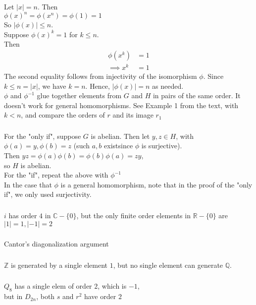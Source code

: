 \documentclass{article}
\newcommand{\ints}{\mathbb{Z}}
\newcommand{\reals}{\mathbb{R}}
\newcommand{\rats}{\mathbb{Q}}
\newcommand{\comps}{\mathbb{C}}
\newcommand{\set}[1]{ \{ #1 \} }
\newcommand{\inv}[1]{ {#1}^{-1} }
\begin{document}
\subsubsection{}
Let $|x| = n$. Then\\
$\phi(x)^n = \phi(x^n) = \phi(1) = 1$\\
So $|\phi(x)| \leq n$.\\
Suppose $\phi(x)^k = 1$ for $k \leq n$.\\
Then
\begin{align*}
\phi(x^k) &= 1\\
\implies x^k &= 1
\end{align*}
The second equality follows from injectivity of the isomorphism $\phi$. Since $k \leq n = |x|$, we have $k = n$. Hence, $|\phi(x)| = n$ as needed.\\
$\phi$ and $\inv{\phi}$ glue together elements from $G$ and $H$ in pairs of the same order. It doesn't work for general homomorphisms. See Example 1 from the text, with $k < n$, and compare the orders of $r$ and its image $r_1$
\subsubsection{}
For the "only if", suppose $G$ is abelian. Then let $y,z \in H$, with $\phi(a) = y, \phi(b) = z$ (such $a,b$ existsince $\phi$ is surjective).\\
Then $yz = \phi(a)\phi(b) = \phi(b)\phi(a) = zy$,\\
so $H$ is abelian.\\
For the "if", repeat the above with $\inv{\phi}$\\
In the case that $\phi$ is a general homomorphism, note that in the proof of the "only if", we only used surjectivity.
\subsubsection{}
$i$ has order $4$ in $\comps - \set{0}$, but the only finite order elements in $\reals - \set{0}$ are $|1|=1, |-1| =2$
\subsubsection{}
Cantor's diagonalization argument
\subsubsection{}
$\ints$ is generated by a single element $1$, but no single element can generate $\rats$.
\subsubsection{}
$Q_8$ has a single elem of order $2$, which is $-1$,\\
but in $D_{2n}$, both $s$ and $r^2$ have order $2$
\end{document}
